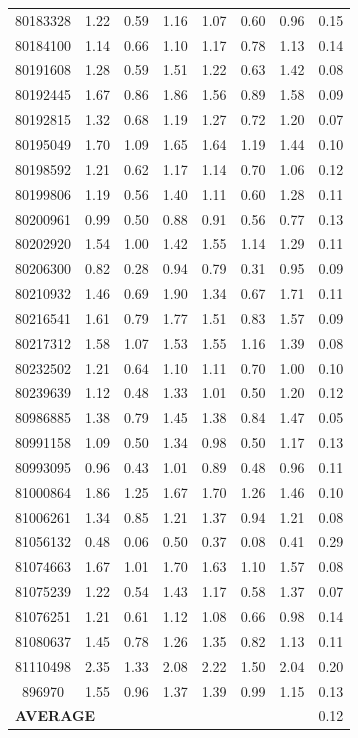 \begin{small}
\begin{longtable}{|c|c c c|c c c|c|}
80183328 & 1.22 & 0.59 & 1.16 & 1.07 & 0.60 & 0.96 & 0.15 \\
80184100 & 1.14 & 0.66 & 1.10 & 1.17 & 0.78 & 1.13 & 0.14 \\
80191608 & 1.28 & 0.59 & 1.51 & 1.22 & 0.63 & 1.42 & 0.08 \\
80192445 & 1.67 & 0.86 & 1.86 & 1.56 & 0.89 & 1.58 & 0.09 \\
80192815 & 1.32 & 0.68 & 1.19 & 1.27 & 0.72 & 1.20 & 0.07 \\
80195049 & 1.70 & 1.09 & 1.65 & 1.64 & 1.19 & 1.44 & 0.10 \\
80198592 & 1.21 & 0.62 & 1.17 & 1.14 & 0.70 & 1.06 & 0.12 \\
80199806 & 1.19 & 0.56 & 1.40 & 1.11 & 0.60 & 1.28 & 0.11 \\
80200961 & 0.99 & 0.50 & 0.88 & 0.91 & 0.56 & 0.77 & 0.13 \\
80202920 & 1.54 & 1.00 & 1.42 & 1.55 & 1.14 & 1.29 & 0.11 \\
80206300 & 0.82 & 0.28 & 0.94 & 0.79 & 0.31 & 0.95 & 0.09 \\
80210932 & 1.46 & 0.69 & 1.90 & 1.34 & 0.67 & 1.71 & 0.11 \\
80216541 & 1.61 & 0.79 & 1.77 & 1.51 & 0.83 & 1.57 & 0.09 \\
80217312 & 1.58 & 1.07 & 1.53 & 1.55 & 1.16 & 1.39 & 0.08 \\
80232502 & 1.21 & 0.64 & 1.10 & 1.11 & 0.70 & 1.00 & 0.10 \\
80239639 & 1.12 & 0.48 & 1.33 & 1.01 & 0.50 & 1.20 & 0.12 \\
80986885 & 1.38 & 0.79 & 1.45 & 1.38 & 0.84 & 1.47 & 0.05 \\
80991158 & 1.09 & 0.50 & 1.34 & 0.98 & 0.50 & 1.17 & 0.13 \\
80993095 & 0.96 & 0.43 & 1.01 & 0.89 & 0.48 & 0.96 & 0.11 \\
81000864 & 1.86 & 1.25 & 1.67 & 1.70 & 1.26 & 1.46 & 0.10 \\
81006261 & 1.34 & 0.85 & 1.21 & 1.37 & 0.94 & 1.21 & 0.08 \\
\rowcolor{lightgray}81056132 & 0.48 & 0.06 & 0.50 & 0.37 & 0.08 & 0.41 & 0.29 \\
81074663 & 1.67 & 1.01 & 1.70 & 1.63 & 1.10 & 1.57 & 0.08 \\
81075239 & 1.22 & 0.54 & 1.43 & 1.17 & 0.58 & 1.37 & 0.07 \\
81076251 & 1.21 & 0.61 & 1.12 & 1.08 & 0.66 & 0.98 & 0.14 \\
81080637 & 1.45 & 0.78 & 1.26 & 1.35 & 0.82 & 1.13 & 0.11 \\
81110498 & 2.35 & 1.33 & 2.08 & 2.22 & 1.50 & 2.04 & 0.20 \\
896970 & 1.55 & 0.96 & 1.37 & 1.39 & 0.99 & 1.15 & 0.13 \\
\hline
\multicolumn{7}{|l}{\textbf{AVERAGE}} & 0.12 \\
\end{longtable}
\end{small}

